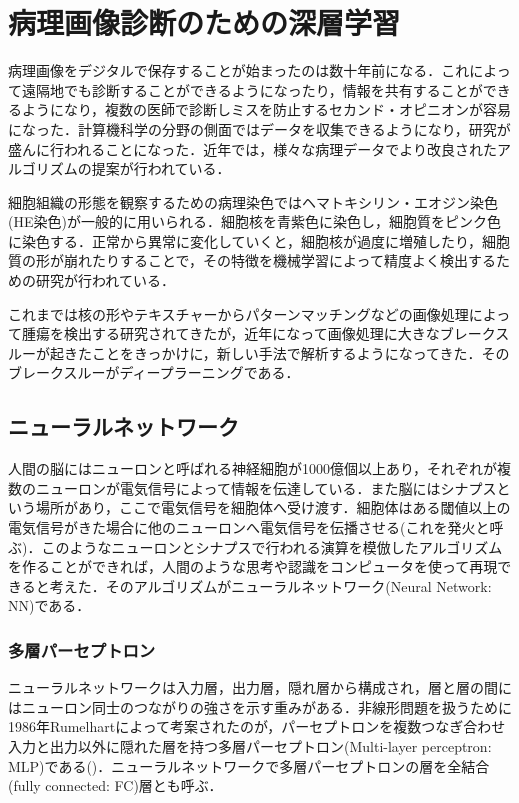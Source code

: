 \chapter{病理画像診断のための深層学習}
\label{chap_review}

病理画像をデジタルで保存することが始まったのは数十年前になる．これによって遠隔地でも診断することができるようになったり，情報を共有することができるようになり，複数の医師で診断しミスを防止するセカンド・オピニオンが容易になった．計算機科学の分野の側面ではデータを収集できるようになり，研究が盛んに行われることになった．近年では，様々な病理データでより改良されたアルゴリズムの提案が行われている\cite{litjens2017survey}．

細胞組織の形態を観察するための病理染色ではヘマトキシリン・エオジン染色(HE染色)が一般的に用いられる．細胞核を青紫色に染色し，細胞質をピンク色に染色する．正常から異常に変化していくと，細胞核が過度に増殖したり，細胞質の形が崩れたりすることで，その特徴を機械学習によって精度よく検出するための研究が行われている\cite{wang2016deep}．

これまでは核の形やテキスチャーからパターンマッチングなどの画像処理によって腫瘍を検出する研究されてきたが\cite{rathore2015novel}，近年になって画像処理に大きなブレークスルーが起きたことをきっかけに，新しい手法で解析するようになってきた．そのブレークスルーがディープラーニングである．

\section{ニューラルネットワーク}\label{sec:NeuralNetwork}
人間の脳にはニューロンと呼ばれる神経細胞が1000億個以上あり，それぞれが複数のニューロンが電気信号によって情報を伝達している．また脳にはシナプスという場所があり，ここで電気信号を細胞体へ受け渡す．細胞体はある閾値以上の電気信号がきた場合に他のニューロンへ電気信号を伝播させる(これを発火と呼ぶ)．このようなニューロンとシナプスで行われる演算を模倣したアルゴリズムを作ることができれば，人間のような思考や認識をコンピュータを使って再現できると考えた．そのアルゴリズムがニューラルネットワーク(Neural Network: NN)である．

\subsection{多層パーセプトロン}
ニューラルネットワークは入力層，出力層，隠れ層から構成され，層と層の間にはニューロン同士のつながりの強さを示す重みがある．非線形問題を扱うために1986年Rumelhartによって考案されたのが，パーセプトロンを複数つなぎ合わせ入力と出力以外に隠れた層を持つ多層パーセプトロン(Multi-layer perceptron: MLP)である()．ニューラルネットワークで多層パーセプトロンの層を全結合(fully connected: FC)層とも呼ぶ．

